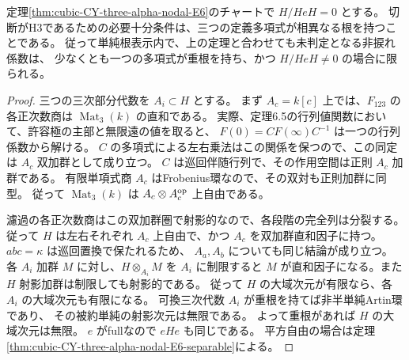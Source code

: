 \begin{proposition}\label{prop:cubic-CY-three-alpha-nodal-E6-full-repeat}
定理\ref{thm:cubic-CY-three-alpha-nodal-E6}のチャートで $H/HeH=0$ とする。
切断がH3であるための必要十分条件は、三つの定義多項式が相異なる根を持つことである。
従って単純根表示内で、上の定理と合わせても未判定となる非捩れ係数は、
少なくとも一つの多項式が重根を持ち、かつ $H/HeH\ne0$ の場合に限られる。
\end{proposition}
\begin{proof}
三つの三次部分代数を $A_i\subset H$ とする。
まず $A_c=k[c]$ 上では、$F_{123}$ の各正次数商は
$\operatorname{Mat}_3(k)$ の直和である。
実際、定理6.5の行列値関数において、許容極の主部と無限遠の値を取ると、
$F(0)=CF(\infty)C^{-1}$ は一つの行列係数から解ける。
$C$ の多項式による左右乗法はこの関係を保つので、この同定は
$A_c$ 双加群として成り立つ。
$C$ は巡回伴随行列で、その作用空間は正則 $A_c$ 加群である。
有限単項式商 $A_c$ はFrobenius環なので、その双対も正則加群に同型。
従って $\operatorname{Mat}_3(k)$ は $A_c\otimes A_c^{\rm op}$ 上自由である。

濾過の各正次数商はこの双加群圏で射影的なので、各段階の完全列は分裂する。
従って $H$ は左右それぞれ $A_c$ 上自由で、かつ $A_c$ を双加群直和因子に持つ。
$abc=\kappa$ は巡回置換で保たれるため、
$A_a,A_b$ についても同じ結論が成り立つ。
各 $A_i$ 加群 $M$ に対し、$H\otimes_{A_i}M$ を $A_i$ に制限すると
$M$ が直和因子になる。また $H$ 射影加群は制限しても射影的である。
従って $H$ の大域次元が有限なら、各 $A_i$ の大域次元も有限になる。
可換三次代数 $A_i$ が重根を持てば非半単純Artin環であり、
その被約単純の射影次元は無限である。
よって重根があれば $H$ の大域次元は無限。
$e$ がfullなので $eHe$ も同じである。
平方自由の場合は定理\ref{thm:cubic-CY-three-alpha-nodal-E6-separable}による。
\end{proof}

